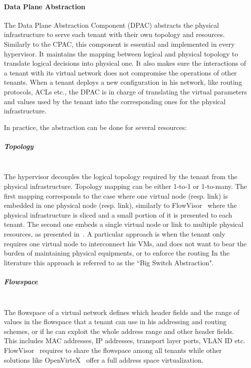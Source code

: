 \paragraph{Data Plane Abstraction}
\label{sec:abstraction_comp}
The Data Plane Abstraction Component (DPAC) abstracts the physical infrastructure to serve each tenant with their own topology and resources.
Similarly to the CPAC, this component is essential and implemented in every hypervisor.
It maintains the mapping between logical and physical topology to translate logical decisions into physical one.
It also makes sure the interactions of a tenant with its virtual network does not compromise the operations of other tenants. When a tenant deploys a new configuration in his network, like routing protocols, ACLs etc., the DPAC is in charge of translating the virtual parameters and values used by the tenant into the corresponding ones for the physical infrastructure.

In practice, the abstraction can be done for several resources:

\subparagraph{\textbf{Topology}}\textbf{}\\
The hypervisor decouples the logical topology required by the tenant from the physical infrastructure.
Topology mapping can be either 1-to-1 or 1-to-many. 
The first mapping corresponds to the case where one virtual node (resp. link) is embedded in one physical node (resp. link), similarly to FlowVisor~\cite{FlowVisor-Sherwood2009} where the physical infrastructure is sliced and a small portion of it is presented to each tenant.
The second one embeds a single virtual node or link to multiple physical resources, as presented in~\cite{OpenVirteX-Al-Shabibi2014,VeRTIGO-Corin2012a}.
A particular approach is when the tenant only requires one virtual node to interconnect his VMs, and does not want to bear the burden of maintaining physical equipments, or to enforce the routing \etc In the literature this approach is referred to as the ``Big Switch Abstraction".


\subparagraph{\textbf{Flowspace}}\textbf{}\\
The flowspace of a virtual network defines which header fields and the range of values in the flowspace that a tenant can use in his addressing and routing schemes, or if he can exploit the whole address range and other header fields.
This includes MAC addresses, IP addresses, transport layer ports, VLAN ID etc.
FlowVisor~\cite{FlowVisor-Sherwood2009} requires to share the flowspace among all tenants while other solutions like OpenVirteX~\cite{OpenVirteX-Al-Shabibi2014} offer a full address space virtualization.


